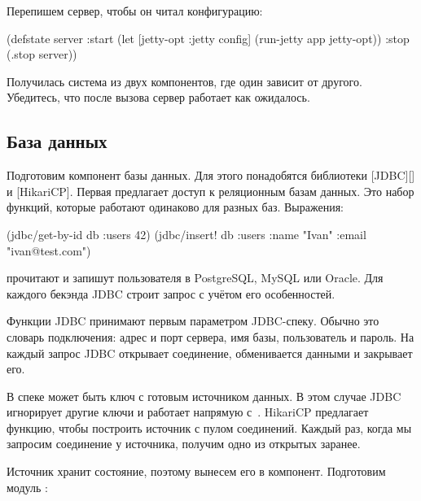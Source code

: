 \fi

\noindent
Перепишем сервер, чтобы он читал конфигурацию:

\begin{clojure}
(defstate server
  :start
  (let [{jetty-opt :jetty} config]
    (run-jetty app jetty-opt))
  :stop
  (.stop server))
\end{clojure}

Получилась система из двух компонентов, где один зависит от другого. Убедитесь,
что после вызова  сервер работает как ожидалось.

\subsection{База данных}


\ifafive
\setlength{\marginparoffset}{-20mm}
\fi

Подготовим компонент базы данных. Для этого понадобятся библиотеки
[JDBC][\marginparoffset] и
[HikariCP].
Первая предлагает доступ к реляционным базам данных. Это набор функций, которые
работают одинаково для разных баз. Выражения:

\begin{clojure}
(jdbc/get-by-id db :users 42)
(jdbc/insert! db :users
   {:name "Ivan" :email "ivan@test.com"})
\end{clojure}

\noindent
прочитают и запишут пользователя в Postgre\-SQL, MySQL или Oracle. Для каждого
бекэнда JDBC строит запрос с учётом его особенностей.


Функции JDBC принимают первым параметром JDBC-спеку. Обычно это словарь
подключения: адрес и порт сервера, имя базы, пользователь и пароль. На каждый
запрос JDBC открывает соединение, обменивается данными и закрывает его.

В спеке может быть ключ  с готовым источником данных. В этом случае
JDBC игнорирует другие ключи и работает напрямую с~. HikariCP
предлагает функцию, чтобы построить источник с пулом соединений. Каждый раз,
когда мы запросим соединение у источника, получим одно из открытых заранее.


Источник хранит состояние, поэтому вынесем его в компонент. Подготовим модуль
:

